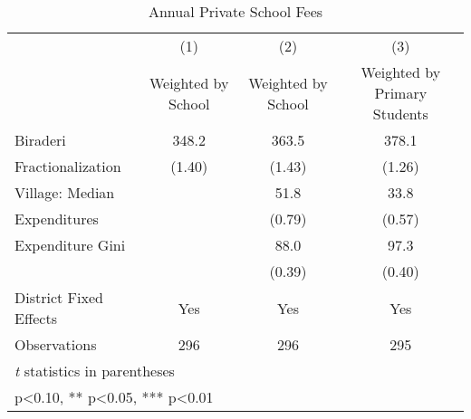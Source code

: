 \begin{table}[htbp]\centering
\def\sym#1{\ifmmode^{#1}\else\(^{#1}\)\fi}
\caption{Annual Private School Fees\label{fees}}
\begin{tabular}{l*{3}{c}}
\toprule
                &\multicolumn{1}{c}{(1)}&\multicolumn{1}{c}{(2)}&\multicolumn{1}{c}{(3)}\\
                &\multicolumn{1}{c}{Weighted by School}&\multicolumn{1}{c}{Weighted by School}&\multicolumn{1}{c}{Weighted by Primary Students}\\
\midrule
Biraderi        &    348.2   &    363.5   &    378.1   \\
Fractionalization&   (1.40)   &   (1.43)   &   (1.26)   \\
Village: Median &            &     51.8   &     33.8   \\
Expenditures    &            &   (0.79)   &   (0.57)   \\
Expenditure Gini&            &     88.0   &     97.3   \\
                &            &   (0.39)   &   (0.40)   \\
District Fixed Effects &      Yes   &      Yes   &      Yes   \\
\midrule
Observations    &      296   &      296   &      295   \\
\bottomrule
\multicolumn{4}{l}{\footnotesize \textit{t} statistics in parentheses}\\
\multicolumn{4}{l}{\footnotesize * p<0.10, ** p<0.05, *** p<0.01}\\
\end{tabular}
\end{table}

